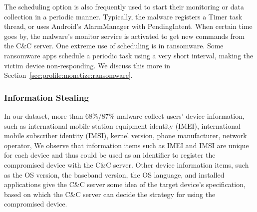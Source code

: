 The scheduling option is also frequently used to start their monitoring or data collection in a 
periodic manner. Typically, the malware registers a Timer task thread, or
uses Android's AlarmManager with PendingIntent.
When certain time goes by, the malware's monitor service is activated
to get new commands from the C\&C server.
One extreme use of scheduling is in ransomware. Some ransomware apps schedule
a periodic task using a very short interval, making the victim device
non-responding. We discuss this more in Section~\ref{sec:profile:monetize:ransomware}.

\vspace{-.1in}
\subsubsection{Information Stealing}
\label{sec:profile:behavior:steal}

In our dataset, more than 68\%/87\%
malware collect users' device information,
such as international mobile station equipment identity (IMEI), 
international mobile subscriber identity (IMSI),
kernel version, phone manufacturer,
network operator, \etc
We observe that information items such as IMEI and IMSI
are unique for each device and thus
could be used as an identifier
to register the compromised device with the C\&C server.
Other device information items,
such as the OS version, the baseband version,
the OS language, and installed applications
give the C\&C server some
idea of the target device's specification,
based on which the C\&C server can
decide the strategy for using the compromised device.
  

